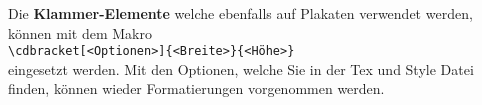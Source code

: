 \documentclass[rgb]{beamer}
\begin{document}
%
%
%
%
%
%
%
%
%
%
%
%
%
%

\begin{frame}[t]
\subsectionpage%
Die \textbf{Klammer-Elemente} welche ebenfalls auf Plakaten verwendet werden, können mit dem Makro\\%
\hskip 1cm \texttt{\textbackslash cdbracket[<Optionen>]\{<Breite>\}\{<Höhe>\}}\\%
eingesetzt werden. Mit den Optionen, welche Sie in der Tex und Style Datei finden, können wieder Formatierungen vorgenommen werden.\\[\baselineskip]%
\centering\cdbracket[thick=8pt, mode=bottom, arrowleft=true, arrowright=true, arrowmiddle=true]{10cm}{2cm}\\[2cm]%
\end{frame}
\end{document}
